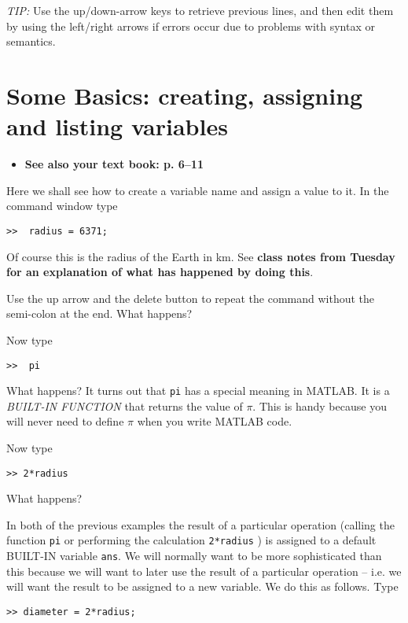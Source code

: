 \documentclass[letterpaper]{article}
\begin{document}
{\it TIP:} Use the up/down-arrow keys to retrieve previous lines, and then edit them by
using the left/right arrows
if errors occur due to problems with syntax or semantics. 
 
 
\section {Some Basics: creating, assigning and listing variables }


\begin{itemize}
\item {\bf See also your text book: p. 6--11} 
\end{itemize}

Here we shall see how to create a variable name and assign a value to it.   In the command window type
\begin{verbatim}
>>  radius = 6371;
\end{verbatim}

Of course this is the radius of the Earth in km.  See {\bf class notes from Tuesday for an explanation of what has happened by doing this}.

Use the up arrow and the delete button to repeat the command without the semi-colon at the end.  What happens?

Now type 
\begin{verbatim}
>>  pi
\end{verbatim}

What happens?  It turns out that \verb+pi+ has a special meaning in MATLAB.  It is a 
{\it BUILT-IN FUNCTION} that returns the value
of $\pi$.   This is handy because you will never need to define
$\pi$ when you write MATLAB code.

Now type
\begin{verbatim}
>> 2*radius
\end{verbatim}

What happens?  

In both of the previous examples the result of a particular operation (calling the function \verb+pi+ or performing the
calculation \verb+2*radius+ ) is assigned to a default BUILT-IN variable \verb+ans+.  We will normally want to be more sophisticated than
this because we will want to later use the result of a particular operation -- i.e. we will want the result to be assigned to a new variable.
We do this as follows.  Type

\begin{verbatim}
>> diameter = 2*radius;
\end{verbatim}
\end{document}
